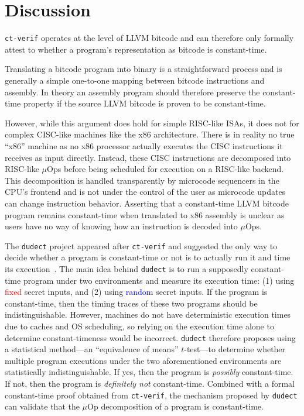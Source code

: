 \section{Discussion}\label{sec:discussion}

\texttt{ct-verif} operates at the level of LLVM bitcode and can therefore only formally attest to whether a program's
representation as bitcode is constant-time.

Translating a bitcode program into binary is a straightforward process and is generally a simple one-to-one mapping between bitcode instructions and assembly.
In theory an assembly program should therefore preserve the constant-time property if the source LLVM bitcode is proven to be constant-time.

However, while this argument does hold for simple RISC-like ISAs, it does not for complex CISC-like machines like the x86 architecture.
There is in reality no true ``x86'' machine as no x86 processor actually executes the CISC instructions it receives as input directly.
Instead, these CISC instructions are decomposed into RISC-like $\mu$Ops before being scheduled for execution on a RISC-like backend.
This decomposition is handled transparently by microcode sequencers in the CPU's frontend and is not under the control of the user as microcode updates can change instruction behavior.
Asserting that a constant-time LLVM bitcode program remains constant-time when translated to x86 assembly is unclear as users have no way of knowing how an instruction is decoded into $\mu$Ops.

The \texttt{dudect} project appeared after \texttt{ct-verif} and suggested the only way to decide whether a program is constant-time or not is to actually run it and time its execution~\cite{dudect}.
The main idea behind \texttt{dudect} is to run a supposedly constant-time program under two environments and measure its execution time: (1) using \textcolor{red}{fixed} secret inputs, and (2) using \textcolor{blue}{random} secret inputs.
If the program is constant-time, then the timing traces of these two programs should be indistinguishable.
However, machines do not have deterministic execution times due to caches and OS scheduling, so relying on the execution time alone to determine constant-timeness would be incorrect.
\texttt{dudect} therefore proposes using a statistical method---an ``equivalence of means'' $t$-test---to determine whether multiple program executions under the two aforementioned environments are statistically indistinguishable.
If yes, then the program is \emph{possibly} constant-time. If not, then the program is \emph{definitely not} constant-time.
Combined with a formal constant-time proof obtained from \texttt{ct-verif}, the mechanism proposed by \texttt{dudect} can validate that the $\mu$Op decomposition of a program is constant-time.

